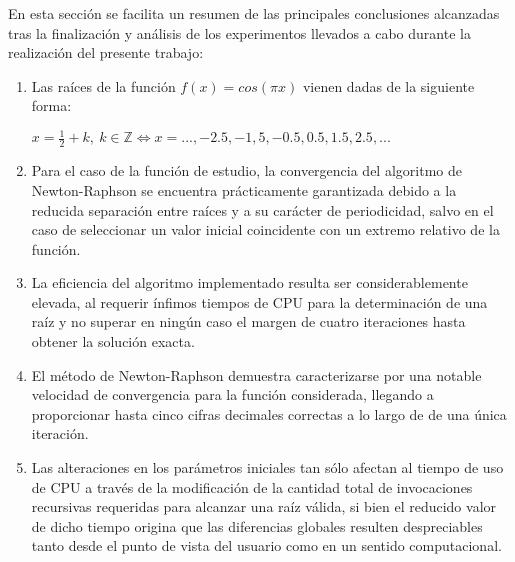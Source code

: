 
\setlength{\parskip}{2mm}

En esta secci\'on se facilita un resumen de las principales conclusiones alcanzadas
tras la finalizaci\'on y an\'alisis de los experimentos llevados a cabo durante la
realizaci\'on del presente trabajo:

\begin{enumerate}
    \item
      Las ra\'ices de la funci\'on $f(x) = cos (\pi x)$ vienen dadas de la siguiente forma:
      \begin{center}
      $x = \frac{1}{2} + k, \ k \in \mathbb{Z} \iff x = ..., -2.5, -1,5, -0.5, 0.5, 1.5, 2.5, ...$
      \end{center}
    \item
      Para el caso de la funci\'on de estudio, la convergencia del algoritmo de Newton-Raphson
      se encuentra pr\'acticamente garantizada debido a la reducida separaci\'on entre raíces y a su
      carácter de periodicidad, salvo en el caso de seleccionar un valor inicial coincidente
      con un extremo relativo de la funci\'on.
    \item
      La eficiencia del algoritmo implementado resulta ser considerablemente elevada, al requerir
      \'infimos tiempos de CPU para la determinaci\'on de una ra\'iz y no superar en ning\'un caso el 
      margen de cuatro iteraciones hasta obtener la soluci\'on exacta.
    \item
      El m\'etodo de Newton-Raphson demuestra caracterizarse por una notable velocidad de convergencia
      para la funci\'on considerada, llegando a proporcionar hasta cinco cifras decimales correctas a 
      lo largo de de una \'unica iteraci\'on.
    \item
      Las alteraciones en los par\'ametros iniciales tan s\'olo afectan al tiempo de uso de CPU a trav\'es
      de la modificaci\'on de la cantidad total de invocaciones recursivas requeridas para alcanzar
      una ra\'iz v\'alida, si bien el reducido valor de dicho tiempo origina que las diferencias globales
      resulten despreciables tanto desde el punto de vista del usuario como en un sentido computacional.
\end{enumerate}


